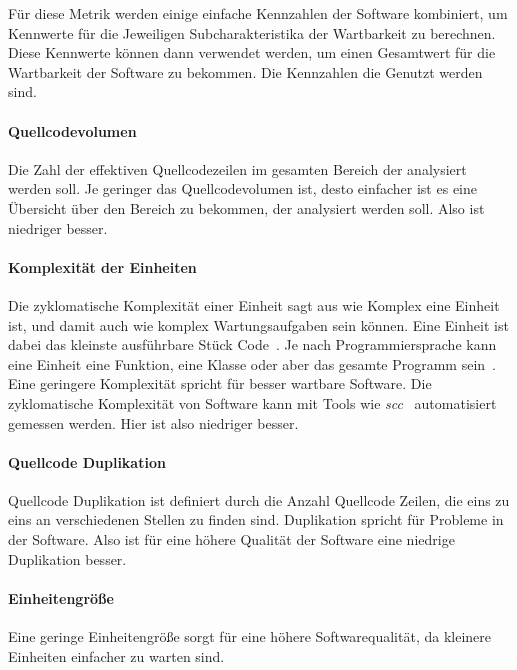 \documentclass[12pt, a4paper, ngerman]{article}
\begin{document}
Für diese Metrik werden einige einfache Kennzahlen der Software kombiniert,
um Kennwerte für die Jeweiligen Subcharakteristika der Wartbarkeit zu berechnen.
Diese Kennwerte können dann verwendet werden, um einen Gesamtwert
für die Wartbarkeit der Software zu bekommen.
Die Kennzahlen die Genutzt werden sind.

\paragraph{Quellcodevolumen}

Die Zahl der effektiven Quellcodezeilen im gesamten Bereich der analysiert werden soll.
Je geringer das Quellcodevolumen ist,
desto einfacher ist es eine Übersicht über den Bereich zu bekommen,
der analysiert werden soll.
Also ist niedriger besser.

\paragraph{Komplexität der Einheiten}

Die zyklomatische Komplexität einer Einheit sagt aus wie Komplex eine Einheit ist,
und damit auch wie komplex Wartungsaufgaben sein können.
Eine Einheit ist dabei das kleinste ausführbare Stück Code~\cite{maintainability_metrics}.
Je nach Programmiersprache kann eine Einheit eine Funktion, eine Klasse oder aber das gesamte Programm sein~\cite{maintainability_metrics}.
Eine geringere Komplexität spricht für besser wartbare Software.
Die zyklomatische Komplexität von Software kann mit Tools
wie \emph{scc}~\cite{scc} automatisiert gemessen werden.
Hier ist also niedriger besser.

\paragraph{Quellcode Duplikation}

Quellcode Duplikation ist definiert durch die Anzahl Quellcode Zeilen,
die eins zu eins an verschiedenen Stellen zu finden sind.
Duplikation spricht für Probleme in der Software.
Also ist für eine höhere Qualität der Software eine niedrige Duplikation besser.

\paragraph{Einheitengröße}

Eine geringe Einheitengröße sorgt für eine höhere Softwarequalität,
da kleinere Einheiten einfacher zu warten sind.
\end{document}
